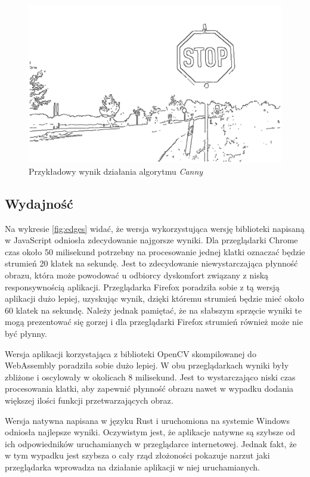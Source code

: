 \documentclass[language=polish,type=master]{aghmodern}
\begin{document}
\begin{figure}[H]
    \centering
    \includegraphics[width=\textwidth]{images/edges.pdf}
    \vspace*{10pt}
    \caption{Przykładowy wynik działania algorytmu \emph{Canny}}
    \label{fig:edges_example}
\end{figure}

\subsection{Wydajność}
Na wykresie \ref{fig:edges} widać, że wersja wykorzystująca wersję biblioteki napisaną w JavaScript odniosła zdecydowanie najgorsze wyniki.
Dla przeglądarki Chrome czas około 50 milisekund potrzebny na procesowanie jednej klatki oznaczać będzie strumień 20 klatek na sekundę.
Jest to zdecydowanie niewystarczająca płynność obrazu, która może powodować u odbiorcy dyskomfort związany z niską responsywnością aplikacji.
Przeglądarka Firefox poradziła sobie z tą wersją aplikacji dużo lepiej, uzyskując wynik, dzięki któremu strumień będzie mieć około 60 klatek na sekundę.
Należy jednak pamiętać, że na słabszym sprzęcie wyniki te mogą prezentować się gorzej i dla przeglądarki Firefox strumień również może nie być płynny.

Wersja aplikacji korzystająca z biblioteki OpenCV skompilowanej do WebAssembly poradziła sobie dużo lepiej.
W obu przeglądarkach wyniki były zbliżone i oscylowały w okolicach 8 milisekund.
Jest to wystarczająco niski czas procesowania klatki, aby zapewnić płynność obrazu nawet w wypadku dodania większej ilości funkcji przetwarzających obraz.

Wersja natywna napisana w języku Rust i uruchomiona na systemie Windows odniosła najlepsze wyniki.
Oczywistym jest, że aplikacje natywne są szybsze od ich odpowiedników uruchamianych w przeglądarce internetowej.
Jednak fakt, że w tym wypadku jest szybsza o cały rząd złożoności pokazuje narzut jaki przeglądarka wprowadza na działanie aplikacji w niej uruchamianych.
\end{document}
